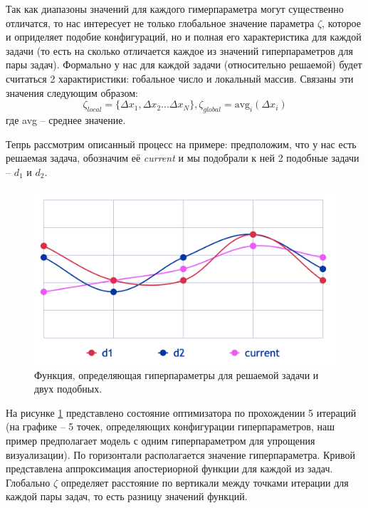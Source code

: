 \documentclass[times,specification,annotation]{itmo-student-thesis}
\begin{document}
	Так как диапазоны значений для каждого гимерпараметра могут существенно отличатся, то нас интересует не только глобальное значение параметра $ \zeta $, которое и оприделяет подобие конфигураций, но и полная его характеристика для каждой задачи (то есть на сколько отличается каждое из значений гиперпараметров для пары задач). Формально у нас для каждой задачи (относительно решаемой) будет считаться 2 характиристики: гобальное число и локальный массив. Связаны эти значения следующим образом: 
	\begin{equation}
	\mathit \zeta_{local} = \{\Delta x_{1}, \Delta x_{2}...\Delta x_{N}\}, \zeta_{global} = \mathrm{avg}_{i}(\Delta x_{i})
	\label{eq:zeta}
	\end{equation}
	где avg -- среднее значение. \par 
	Тепрь рассмотрим описанный процесс на примере: предположим, что у нас есть решаемая задача, обозначим её \textit{current} и мы подобрали к ней 2 подобные задачи -- $ d_{1} $ и $ d_{2} $. 
	\begin{figure}[!ht]
		\caption{Функция, определяющая гиперпараметры для решаемой задачи и двух подобных.}\label{img:hp-curves}
		\includegraphics[width=0.85\linewidth]{hp-curves}
		\centering
	\end{figure}
	На рисунке \ref{img:hp-curves} представлено состояние оптимизатора по прохождении 5 итераций (на графике -- 5 точек, определяющих конфигурации гиперпараметров, наш пример предполагает модель с одним гиперпараметром для упрощения визуализации). По горизонтали располагается значение гиперпараметра. Кривой представлена аппроксимация апостериорной функции для каждой из задач. Глобально $ \zeta $ определяет расстояние по вертикали между точками итерации для каждой пары задач, то есть разницу значений функций. \par 
	
\end{document}
